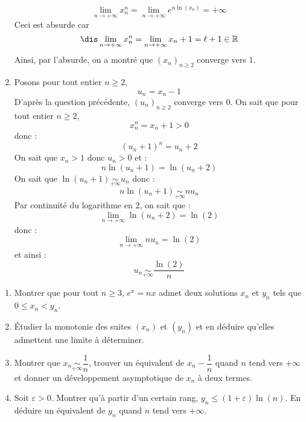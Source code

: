 \documentclass[a4paper,10pt]{report}
\begin{document}
\begin{enumerate}
\[ \lim_{n \rightarrow + \infty} x_n^n = \lim_{n \rightarrow + \infty} e^{n \ln(x_n)} = + \infty \]
Ceci est absurde car 
$$\dis \lim_{n \rightarrow + \infty} x_n^n = \lim_{n \rightarrow + \infty} x_n + 1 = \ell + 1 \in \mathbb{R}$$
Ainsi, par l'absurde, on a montré que $(x_n)_{n \geq 2}$ converge vers $1$.
\item Posons pour tout entier $n \geq 2$, 
$$ u_n = x_n -1$$
D'après la question précédente, $(u_n)_{n \geq 2}$ converge vers $0$.  On sait que pour tout entier $n \geq 2$,
$$ x_n^n = x_n + 1 >0$$
donc :
$$ (u_n+1)^n = u_n +2 $$
On sait que $x_n>1$ donc $u_n>0$ et :
$$ n \ln(u_n + 1) = \ln(u_n+2)$$
On sait que $\ln(u_n+1) \underset{+ \infty}{\sim} u_n$ donc :
$$ n \ln(u_n + 1) \underset{+ \infty}{\sim} nu_n$$
Par continuité du logarithme en $2$, on sait que :
$$ \lim_{n \rightarrow + \infty} \ln(u_n+2) = \ln(2)$$
donc :
$$ \lim_{n \rightarrow + \infty} n u_n = \ln(2)$$
et ainsi :
$$ u_n \underset{+ \infty}{\sim} \dfrac{\ln(2)}{n}$$
\end{enumerate}


\medskip


\begin{Exa}[\ding{80}] \begin{enumerate}
\item Montrer que pour tout $n \geq 3$, $e^x=nx$ admet deux solutions $x_n$ et $y_n$ tels que $0 \leq x_n <y_n$.
\item Étudier la monotonie des suites $(x_n)$ et $(y_n)$ et en déduire qu'elles admettent une limite à déterminer.
\item Montrer que $x_n \underset{+ \infty}{\sim} \dfrac{1}{n}$, trouver un équivalent de $x_n - \dfrac{1}{n}$ quand $n$ tend vers $+ \infty$ et donner un développement asymptotique de $x_n$ à deux termes.
\item Soit $\varepsilon >0$. Montrer qu'à partir d'un certain rang, $y_n \leq (1+ \varepsilon) \ln(n)$. En déduire un équivalent de $y_n$ quand $n$ tend vers $+ \infty$.
\end{enumerate}
\end{Exa}
\end{document}
